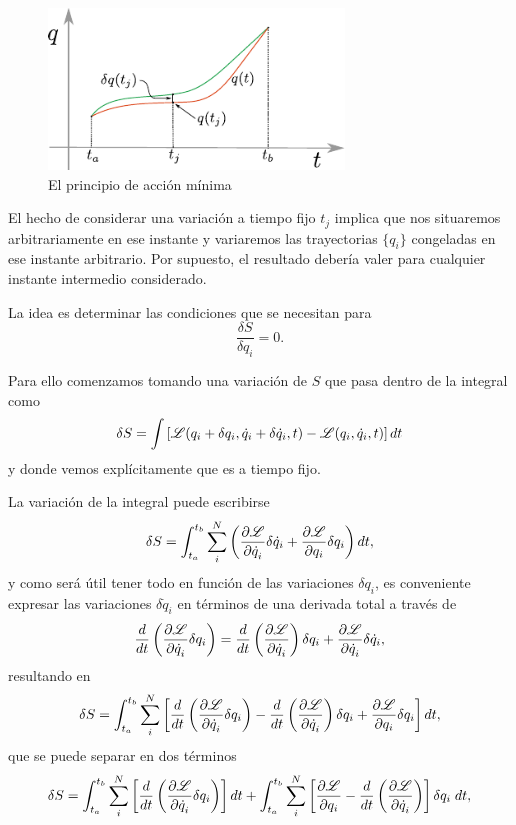 \documentclass[10pt,oneside]{CBFT_book}
\begin{document}
\begin{figure}
	\begin{center}
	\includegraphics[width=0.7\textwidth]{images/fig_accion.pdf}	 
	\end{center}
	\caption{El principio de acción mínima}
	\label{principio_accion_minima}
\end{figure}

El hecho de considerar una variación a tiempo fijo $t_j$ implica que nos situaremos arbitrariamente en ese instante
y variaremos las trayectorias $ \{ q_i \} $ congeladas en ese instante arbitrario. Por supuesto, el resultado debería
valer para cualquier instante intermedio considerado.

La idea es determinar las condiciones que se necesitan para 
\[
	\frac{\delta S}{\delta q_i} = 0.
\]

Para ello comenzamos tomando una variación de $S$ que pasa dentro de la integral como 
\[
	\delta S = \int \left[ \mathscr{L}(q_i + \delta q_i, \dot{q}_i + \delta \dot{q}_i , t )
	- \mathscr{L}(q_i , \dot{q}_i , t ) \right] dt
\]
y donde vemos explícitamente que es a tiempo fijo.

La variación de la integral puede escribirse 
\[
	\delta S =  \int_{t_a}^{t_b} \sum_i^N \left( \frac{\partial^{\hspace{-0.05em}} {\mathscr{L}}}{\partial {\dot{q}_i}^{\hspace{-0.05em}}} \delta \dot{q}_i +
	\frac{\partial^{\hspace{-0.05em}} {\mathscr{L}}}{\partial {q_i}^{\hspace{-0.05em}}} \delta q_i  \right) dt,
\]
y como será útil tener todo en función de las variaciones $\delta q_i$, es conveniente expresar las variaciones $ 
\delta \dot{q}_i $ en términos de una derivada total a través de  
\[
	\frac{d}{dt}\left( \frac{\partial^{\hspace{-0.05em}} {\mathscr{L}}}{\partial {\dot{q}_i}^{\hspace{-0.05em}}} \delta q_i \right) =
	\frac{d}{dt}\left( \frac{\partial^{\hspace{-0.05em}} {\mathscr{L}}}{\partial {\dot{q}_i}^{\hspace{-0.05em}}} \right) \delta q_i + \frac{\partial^{\hspace{-0.05em}} {\mathscr{L}}}{\partial {\dot{q}_i}^{\hspace{-0.05em}}}\delta \dot{q}_i,
\]
resultando en 
\[
	\delta S =  \int_{t_a}^{t_b} \sum_i^N \left[ \frac{d}{dt}\left( \frac{\partial^{\hspace{-0.05em}} {\mathscr{L}}}{\partial {\dot{q}_i}^{\hspace{-0.05em}}} \delta q_i \right) -
	\frac{d}{dt}\left( \frac{\partial^{\hspace{-0.05em}} {\mathscr{L}}}{\partial {\dot{q}_i}^{\hspace{-0.05em}}} \right) \delta q_i + \frac{\partial^{\hspace{-0.05em}} {\mathscr{L}}}{\partial {q_i}^{\hspace{-0.05em}}} \delta q_i  \right] dt,
\]
que se puede separar en dos términos
\[
	\delta S =  \int_{t_a}^{t_b} \sum_i^N \left[ \frac{d}{dt}\left( \frac{\partial^{\hspace{-0.05em}} {\mathscr{L}}}{\partial {\dot{q}_i}^{\hspace{-0.05em}}} \delta q_i \right) 
	\right] dt + \int_{t_a}^{t_b} \sum_i^N \left[ \frac{\partial^{\hspace{-0.05em}} {\mathscr{L}}}{\partial {q_i}^{\hspace{-0.05em}}} - \frac{d}{dt}\left( \frac{\partial^{\hspace{-0.05em}} {\mathscr{L}}}{\partial {\dot{q}_i}^{\hspace{-0.05em}}} 
	\right) \right]  \delta q_i \; dt,
\]
\end{document}
